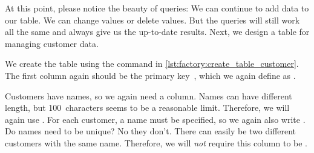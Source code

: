 At this point, please notice the beauty of queries:
We can continue to add data to our table.
We can change values or delete values.
But the queries will still work all the same and always give us the up-to-date results.%
\endhsection%
\FloatBarrier%
\endhsection%
%
\label{sec:factory:table:customer}%
Next, we design a table for managing customer data.%
%
%
%
%
\begin{sloppypar}%
We create the table  using the  command in \cref{lst:factory:create_table_customer}.
The first column again should be the primary key~, which we again define as .
\end{sloppypar}%
%
Customers have names, so we again need a  column.
Names can have different length, but 100~characters seems to be a reasonable limit.
Therefore, we will again use .
For each customer, a name must be specified, so we again also write .
Do names need to be unique?
No they don't.
There can easily be two different customers with the same name.
Therefore, we will \emph{not} require this column to be .


